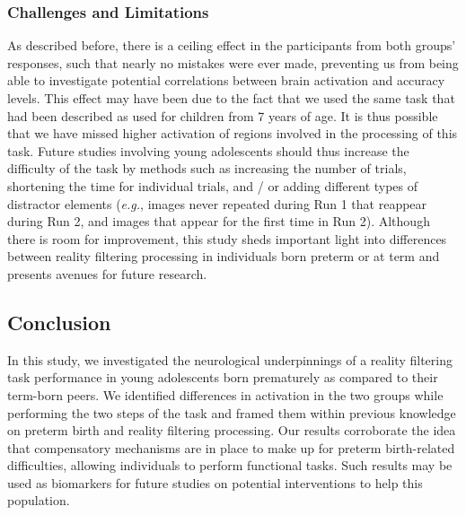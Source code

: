 \subsubsection{Challenges and Limitations} \label{sub:limitations}
 As described before, there is a ceiling effect in the participants from both groups' responses, such that nearly no mistakes were ever made, preventing us from being able to investigate potential correlations between brain activation and accuracy levels. This effect may have been due to the fact that we used the same task that had been described as used for children from 7 years of age. It is thus possible that we have missed higher activation of regions involved in the processing of this task. Future studies involving young adolescents should thus increase the difficulty of the task by methods such as increasing the number of trials, shortening the time for individual trials, and / or adding different types of distractor elements (\textit{e.g.}, images never repeated during Run 1 that reappear during Run 2, and images that appear for the first time in Run 2). Although there is room for improvement, this study sheds important light into differences between reality filtering processing in individuals born preterm or at term and presents avenues for future research.

\subsection*{Conclusion}
In this study, we investigated the neurological underpinnings of a reality filtering task performance in young adolescents born prematurely as compared to their term-born peers. We identified differences in activation in the two groups while performing the two steps of the task and framed them within previous knowledge on preterm birth and reality filtering processing. Our results corroborate the idea that compensatory mechanisms are in place to make up for preterm birth-related difficulties, allowing individuals to perform functional tasks. Such results may be used as biomarkers for future studies on potential interventions to help this population. 



